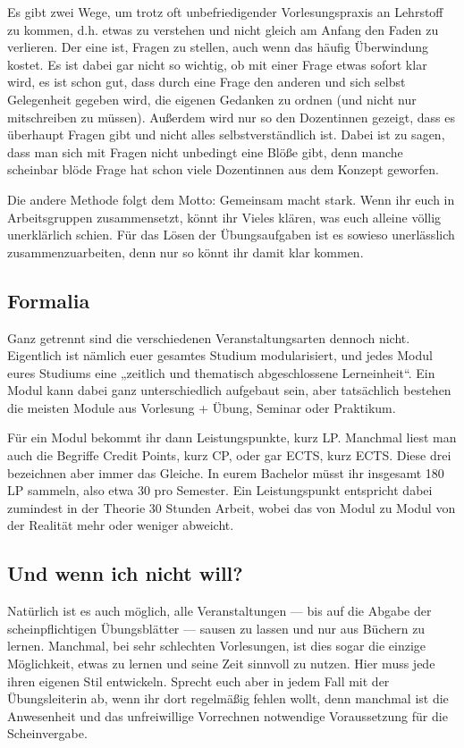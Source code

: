 Es gibt zwei Wege, um trotz oft unbefriedigender Vorlesungspraxis an Lehrstoff zu kommen, d.h. etwas zu verstehen und nicht gleich am Anfang den Faden zu verlieren. Der eine ist, Fragen zu stellen, auch wenn das häufig Überwindung kostet. Es ist dabei gar nicht so wichtig, ob mit einer Frage etwas sofort klar wird, es ist schon gut, dass durch eine Frage den anderen und sich selbst Gelegenheit gegeben wird, die eigenen Gedanken zu ordnen (und nicht nur mitschreiben zu müssen). Außerdem wird nur so den Dozentinnen gezeigt, dass es überhaupt Fragen gibt und nicht alles selbstverständlich ist. Dabei ist zu sagen, dass man sich mit Fragen nicht unbedingt eine Blöße gibt, denn manche scheinbar \glqq{}blöde\grqq{} Frage hat schon viele Dozentinnen aus dem Konzept geworfen.

Die andere Methode folgt dem Motto: \glqq{}Gemeinsam macht stark\grqq{}. Wenn ihr euch in Arbeitsgruppen zusammensetzt, könnt ihr Vieles klären, was euch alleine völlig unerklärlich schien. Für das Lösen der Übungsaufgaben ist es sowieso unerlässlich zusammenzuarbeiten, denn nur so könnt ihr damit klar kommen.

\subsection{Formalia}

Ganz getrennt sind die verschiedenen Veranstaltungsarten dennoch nicht. Eigentlich ist nämlich euer gesamtes Studium modularisiert, und jedes Modul eures Studiums eine „zeitlich und thematisch abgeschlossene Lerneinheit“. Ein Modul kann dabei ganz unterschiedlich aufgebaut sein, aber tatsächlich bestehen die meisten Module aus Vorlesung + Übung, Seminar oder Praktikum.

Für ein Modul bekommt ihr dann Leistungspunkte, kurz \gls{LP}. Manchmal liest man auch die Begriffe Credit Points, kurz \gls{CP}, oder gar \gls{ECTS}, kurz ECTS. Diese drei bezeichnen aber immer das Gleiche. In eurem Bachelor müsst ihr insgesamt 180 \gls{LP} sammeln, also etwa 30 pro Semester. Ein Leistungspunkt entspricht dabei zumindest in der Theorie 30 Stunden Arbeit, wobei das von Modul zu Modul von der Realität mehr oder weniger abweicht.

\subsection{Und wenn ich nicht will?}

Natürlich ist es auch möglich, alle Veranstaltungen --- bis auf die Abgabe der scheinpflichtigen Übungsblätter --- sausen zu lassen und nur aus Büchern zu lernen. Manchmal, bei sehr schlechten Vorlesungen, ist dies sogar die einzige Möglichkeit, etwas zu lernen und seine Zeit sinnvoll zu nutzen. Hier muss jede ihren eigenen Stil entwickeln. Sprecht euch aber in jedem Fall mit der Übungsleiterin ab, wenn ihr dort regelmäßig fehlen wollt, denn manchmal ist die Anwesenheit und das unfreiwillige Vorrechnen notwendige Voraussetzung für die Scheinvergabe.

\vfill\eject

